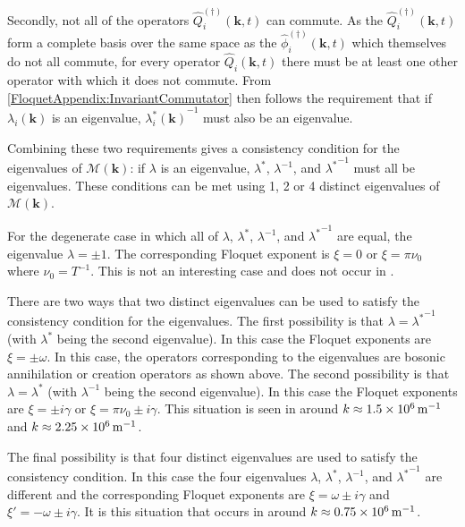 Secondly, not all of the operators $\hat{Q}_i^{(\dagger)}(\bm{k}, t)$ can commute. As the $\hat{Q}_i^{(\dagger)}(\bm{k}, t)$ form a complete basis over the same space as the $\hat{\phi}_i^{(\dagger)}(\bm{k}, t)$ which themselves do not all commute, for every operator $\hat{Q}_i(\bm{k}, t)$ there must be at least one other operator with which it does not commute. From \eqref{FloquetAppendix:InvariantCommutator} then follows the requirement that if $\lambda_i(\bm{k})$ is an eigenvalue,   ${\lambda_i^*(\bm{k})}^{-1}$ must also be an eigenvalue.

Combining these two requirements gives a consistency condition for the eigenvalues of $\mathcal{M}(\bm{k})$: if $\lambda$ is an eigenvalue, $\lambda^*$, $\lambda^{-1}$, and ${\lambda^*}^{-1}$ must all be eigenvalues. These conditions can be met using 1, 2 or 4 distinct eigenvalues of $\mathcal{M}(\bm{k})$.

For the degenerate case in which all of $\lambda$, $\lambda^*$, $\lambda^{-1}$, and ${\lambda^*}^{-1}$ are equal, the eigenvalue $\lambda = \pm 1$. The corresponding Floquet exponent is $\xi = 0$ or $\xi = \pi\nu_0$ where $\displaystyle \nu_0 = T^{-1}$. This is not an interesting case and does not occur in .

There are two ways that two distinct eigenvalues can be used to satisfy the consistency condition for the eigenvalues. The first possibility is that $\lambda = {\lambda^*}^{-1}$ (with $\lambda^*$ being the second eigenvalue). In this case the Floquet exponents are $\xi = \pm \omega$. In this case, the operators corresponding to the eigenvalues are bosonic annihilation or creation operators as shown above. The second possibility is that $\lambda = \lambda^*$ (with $\lambda^{-1}$ being the second eigenvalue). In this case the Floquet exponents are $\xi = \pm i\gamma$ or $\xi = \pi \nu_0 \pm i\gamma$. This situation is seen in  around $k \approx \unit[1.5 \times 10^6]{m}^{-1}$ and $k \approx \unit[2.25 \times 10^6]{m}^{-1}$.

The final possibility is that four distinct eigenvalues are used to satisfy the consistency condition. In this case the four eigenvalues $\lambda$, $\lambda^*$, $\lambda^{-1}$, and ${\lambda^*}^{-1}$ are different and the corresponding Floquet exponents are $\xi = \omega \pm i\gamma$ and $\xi' = -\omega \pm i\gamma$. It is this situation that occurs in  around $k \approx \unit[0.75 \times 10^6]{m}^{-1}$.

